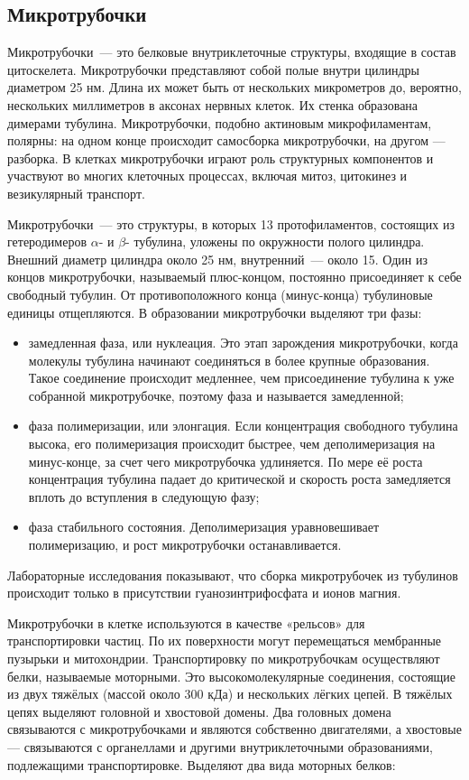 \documentclass[14pt,a4paper]{extarticle}
\begin{document}
 \subsection{Микротрубочки}
 Микротрубочки~--- это белковые внутриклеточные структуры, входящие в состав цитоскелета. Микротрубочки представляют собой полые внутри цилиндры диаметром 25 нм. Длина их может быть от нескольких микрометров до, вероятно, нескольких миллиметров в аксонах нервных клеток. Их стенка образована димерами тубулина. Микротрубочки, подобно актиновым микрофиламентам, полярны: на одном конце происходит самосборка микротрубочки, на другом — разборка. В клетках микротрубочки играют роль структурных компонентов и участвуют во многих клеточных процессах, включая митоз, цитокинез и везикулярный транспорт.
 
 Микротрубочки~--- это структуры, в которых 13 протофиламентов, состоящих из гетеродимеров $\alpha$- и $\beta$- тубулина, уложены по окружности полого цилиндра. 
 Внешний диаметр цилиндра около 25 нм, внутренний~--- около 15.
Один из концов микротрубочки, называемый плюс-концом, постоянно присоединяет к себе свободный тубулин. От противоположного конца (минус-конца) тубулиновые единицы отщепляются.
В образовании микротрубочки выделяют три фазы:

\begin{itemize}
\item замедленная фаза, или нуклеация. Это этап зарождения микротрубочки, когда молекулы тубулина начинают соединяться в более крупные образования. Такое соединение происходит медленнее, чем присоединение тубулина к уже собранной микротрубочке, поэтому фаза и называется замедленной;
\item фаза полимеризации, или элонгация. Если концентрация свободного тубулина высока, его полимеризация происходит быстрее, чем деполимеризация на минус-конце, за счет чего микротрубочка удлиняется. По мере её роста концентрация тубулина падает до критической и скорость роста замедляется вплоть до вступления в следующую фазу;
\item фаза стабильного состояния. Деполимеризация уравновешивает полимеризацию, и рост микротрубочки останавливается.
\end{itemize}

	Лабораторные исследования показывают, что сборка микротрубочек из тубулинов происходит только в присутствии гуанозинтрифосфата и ионов магния.

	Микротрубочки в клетке используются в качестве «рельсов» для транспортировки частиц. По их поверхности могут перемещаться мембранные пузырьки и митохондрии. Транспортировку по микротрубочкам осуществляют белки, называемые моторными. Это высокомолекулярные соединения, состоящие из двух тяжёлых (массой около 300 кДа) и нескольких лёгких цепей. В тяжёлых цепях выделяют головной и хвостовой домены. Два головных домена связываются с микротрубочками и являются собственно двигателями, а хвостовые — связываются с органеллами и другими внутриклеточными образованиями, подлежащими транспортировке.
Выделяют два вида моторных белков:
\end{document}
